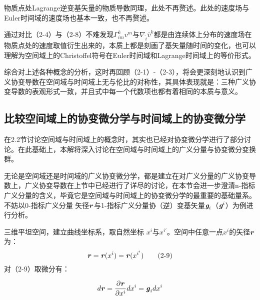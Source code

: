 \documentclass[UTF8]{ctexart}
\begin{document}
\par
物质点处Lagrange逆变基矢量的物质导数同理，此处不再赘述。此处的速度场与Euler时间域的速度场也基本一致，也不再赘述。\par
通过对比（2-4）与（2-8）不难发现$\Gamma_{im}^{k} v^m$与$\nabla_{\hat{i}} {\hat{v}}^k$都是由连续体上分布的速度场在物质点处的速度取值衍生出来的，本质上都是刻画了基矢量随时间的变化，也可以理解为空间域上的Christoffel符号在Euler时间域和Lagrange时间域上的等价形式。\par
综合对上述各种概念的分析，这时再回顾（2-1）-（2-3），将会更深刻地认识到广义协变导数在空间域与时间域上无与伦比的对称性，其具体表现就是：三种广义协变导数的表观形式一致，并且式中每一个代数项也都有着相同的本质与意义。\par


\subsection{比较空间域上的协变微分学与时间域上的协变微分学}
在2.2节讨论空间域与时间域上的概念时，其实也已经对协变微分学进行了部分讨论。在此基础上，本解将深入讨论在空间域与时间域上的广义分量与协变微分变换群。\par
无论是空间域还是时间域的广义协变微分学，都是建立在对广义分量的广义协变导数上，广义协变导数在上节中已经进行了详尽的讨论，在本节会进一步澄清n-指标广义分量的含义，毕竟它是空间域与时间域上的协变微分学的最重要的基础量系。不妨以0-指标广义分量 矢径$\textbf{\textit{r}}$与1-指标广义分量协（逆）变基矢量$\textit{\textbf{g}}_i$（$\textit{\textbf{g}}^i$）为例进行分析。\par
三维平坦空间，建立曲线坐标系，取自然坐标 $x^i$与$x^{i'}
$。空间中任意一点$x^i$的矢径$\textbf{\textit{r}}$为：
\begin{equation*}
    \textbf{\textit{r}}=\textbf{\textit{r}}(x^i)=\textbf{\textit{r}}(x^{i'})
    \tag{2-9}
\end{equation*}
对（2-9）取微分有：\par
\begin{equation*}
    d\textbf{\textit{r}}=\frac{\partial \textbf{\textit{r}}}{\partial x^i}dx^i=
    \textbf{\textit{g}}_i dx^i
\end{equation*}
\end{document}
